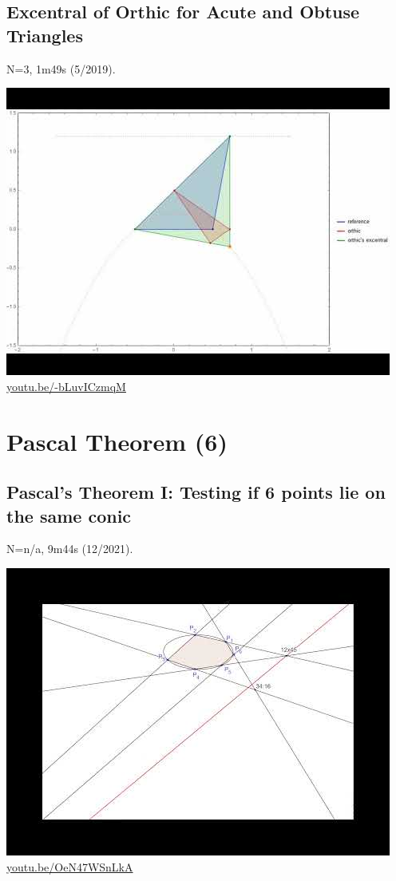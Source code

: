 \documentclass[12pt]{amsart}
\begin{document}
\subsection{Excentral of Orthic for Acute and Obtuse Triangles}
\label{vid:-bLuvICzmqM}
\noindent N=3, 1m49s (5/2019). 
\begin{center}\includegraphics[width=.5\textwidth]{pics/-bLuvICzmqM.jpg} \\ 
\href{https://youtu.be/-bLuvICzmqM}{\url{youtu.be/-bLuvICzmqM}}\end{center}
% 


\section{Pascal Theorem (6)}

\subsection{Pascal's Theorem I: Testing if 6 points lie on the same conic}
\label{vid:OeN47WSnLkA}
\noindent N=n/a, 9m44s (12/2021). 
\begin{center}\includegraphics[width=.5\textwidth]{pics/OeN47WSnLkA.jpg} \\ 
\href{https://youtu.be/OeN47WSnLkA}{\url{youtu.be/OeN47WSnLkA}}\end{center}
% 
\end{document}
